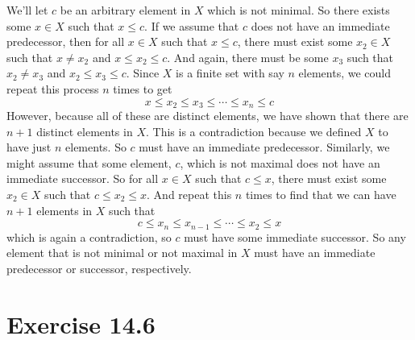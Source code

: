 \documentclass[11pt]{article}
\begin{document}
We'll let $c$ be an arbitrary element in $X$ which is not minimal. So there exists some $x\in X$ such that $x\leq c$. If we assume that $c$ does not have an immediate predecessor, then for all $x\in X$ such that $x \leq c$, there must exist some $x_2\in X$ such that  $x\ne x_2$ and $x\leq x_2 \leq c$. And again, there must be some $x_3$ such that $x_2\ne x_3$ and $x_2 \leq x_3 \leq c$. Since $X$ is a finite set with say $n$ elements, we could repeat this process $n$ times to get
\[x \leq x_2 \leq x_3 \leq \cdots \leq x_n \leq c\]
However, because all of these are distinct elements, we have shown that there are $n+1$ distinct elements in $X$. This is a contradiction because we defined $X$ to have just $n$ elements. So $c$ must have an immediate predecessor. Similarly, we might assume that some element, $c$, which is not maximal does not have an immediate successor. So for all $x\in X$ such that $c\leq x$, there must exist some $x_2\in X$ such that $c\leq x_2 \leq x$. And repeat this $n$ times to find that we can have $n+1$ elements in $X$ such that
\[c \leq x_n \leq x_{n-1} \leq \cdots \leq x_2 \leq x\]
which is again a contradiction, so $c$ must have some immediate successor. So any element that is not minimal or not maximal in $X$ must have an immediate predecessor or successor, respectively.


\section*{Exercise 14.6}
\\
\end{document}
